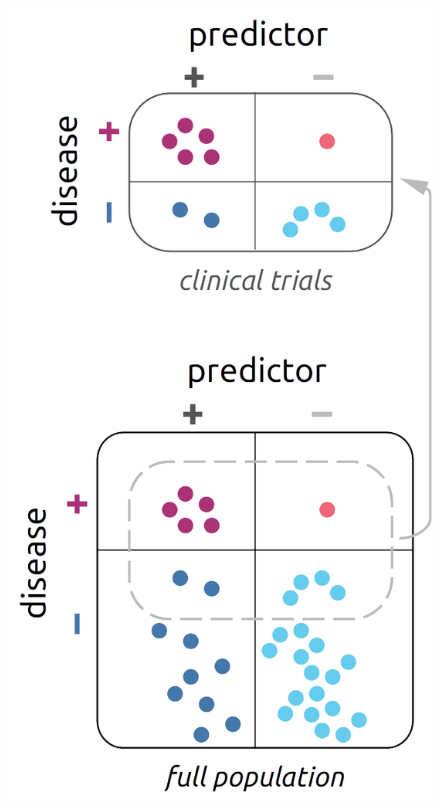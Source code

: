 \documentclass[utf8]{FrontiersinHarvard} %
\renewcommand*{\|}[1][]{\nonscript\:#1\vert\nonscript\:\mathopen{}}
\begin{document}
\setlength{\intextsep}{0ex}%
\setlength{\columnsep}{1ex}%
\begin{figure}%
\includegraphics[width=\linewidth]{baseratefallacy3.png}%
\end{figure}%
\end{document}
